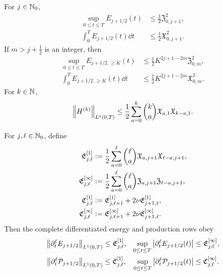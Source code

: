 {\begin{theorem}
For \(j\in\mathbb N_0\),
\begin{align}
 \sup_{0\le t\le T}E_{j+1/2}(t)
 &\le\frac12\mathfrak Z_{0,j+1}^2,
 \label{eq:qc-sharp-critical-sup}\\
 \int_0^TE_{j+1/2}(t)\dd t
 &\le\frac12\mathfrak X_{0,j+1}^2.
 \label{eq:qc-sharp-critical-mass}
\end{align}
If \(m>j+\frac12\) is an integer, then
\begin{align}
 \sup_{0\le t\le T}E_{j+1/2,\ge K}(t)
 &\le\frac12K^{2j+1-2m}\mathfrak Z_{0,m}^2,
 \label{eq:qc-sharp-critical-tail-sup}\\
 \int_0^TE_{j+1/2,\ge K}(t)\dd t
 &\le\frac12K^{2j+1-2m}\mathfrak X_{0,m}^2.
 \label{eq:qc-sharp-critical-tail-mass}
\end{align}
For \(k\in\mathbb N\),
\begin{equation}
 \left\lVert H^{(k)}\right\rVert_{L^1(0,T)}
 \le\frac12\sum_{a=0}^{k}\binom ka
 \mathfrak X_{a,1}\mathfrak X_{k-a,1}.
 \label{eq:qc-sharp-height-derivatives}
\end{equation}
\begin{samepage}
For \(j,\ell\in\mathbb N_0\), define
\begin{align}
 \mathfrak E_{j,\ell}^{[1]}
 &:=\frac12\sum_{a=0}^{\ell}\binom\ell a
 \mathfrak X_{a,j+1}\mathfrak X_{\ell-a,j+1},
 \notag\\
 \mathfrak E_{j,\ell}^{[\infty]}
 &:=\frac12\sum_{a=0}^{\ell}\binom\ell a
 \mathfrak Z_{a,j+1}\mathfrak Z_{\ell-a,j+1},
 \label{eq:qc-height-row-majorants}\\
 \mathfrak C_{j,\ell}^{[1]}
 &:=\mathfrak E_{j,\ell+1}^{[1]}
    +2\nu\mathfrak E_{j+1,\ell}^{[1]},
 \notag\\
 \mathfrak C_{j,\ell}^{[\infty]}
 &:=\mathfrak E_{j,\ell+1}^{[\infty]}
    +2\nu\mathfrak E_{j+1,\ell}^{[\infty]}.
 \label{eq:qc-production-row-majorants}
\end{align}
Then the complete differentiated energy and production rows obey
\begin{align}
 \left\lVert \partial_t^\ell E_{j+1/2}\right\rVert_{L^1(0,T)}
 &\le\mathfrak E_{j,\ell}^{[1]},
 &
 \sup_{0\le t\le T}
 \left|\partial_t^\ell E_{j+1/2}(t)\right|
 &\le\mathfrak E_{j,\ell}^{[\infty]},
 \label{eq:qc-sharp-energy-row-family}\\
 \left\lVert \partial_t^\ell\mathcal P_{j+1/2}\right\rVert_{L^1(0,T)}
 &\le\mathfrak C_{j,\ell}^{[1]},
 &
 \sup_{0\le t\le T}
 \left|\partial_t^\ell\mathcal P_{j+1/2}(t)\right|
 &\le\mathfrak C_{j,\ell}^{[\infty]}.
 \label{eq:qc-sharp-production-row-family}
\end{align}
\end{samepage}

\end{theorem}}
